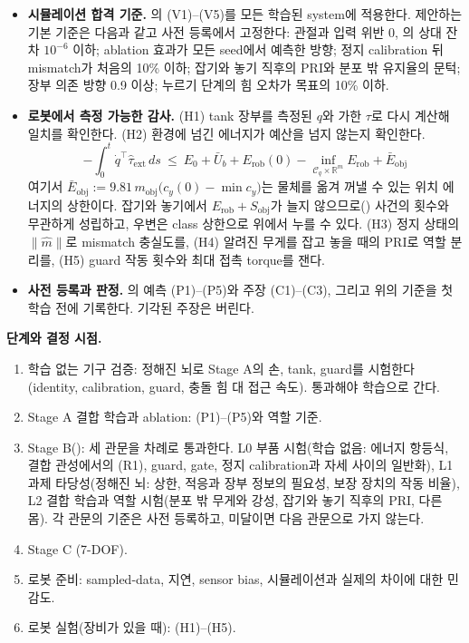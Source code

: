 \documentclass[11pt]{article}\usepackage[margin=1in]{geometry}\usepackage{amsmath,amssymb,amsthm,mathtools}\usepackage{graphicx}\graphicspath{{figures/}{../figures/}{figs/}{./}}\usepackage{enumitem}\usepackage{hyperref}\usepackage{cleveref}\usepackage{tikz}\usetikzlibrary{arrows.meta,positioning,calc,shapes.geometric}\usepackage{float}\usepackage{rotating}\usepackage[most]{tcolorbox}\usepackage{kotex}\usepackage{booktabs}\usepackage{longtable}\emergencystretch=1.6em\tolerance=2000 \crefname{assumption}{Assumption}{Assumptions}\Crefname{assumption}{Assumption}{Assumptions}\crefname{definition}{Definition}{Definitions}\Crefname{definition}{Definition}{Definitions}\crefname{proposition}{Proposition}{Propositions}\Crefname{proposition}{Proposition}{Propositions}\crefname{fact}{Fact}{Facts}\Crefname{fact}{Fact}{Facts} \newtheorem{assumption}{Assumption}\newtheorem{definition}{Definition}\newtheorem{lemma}{Lemma}\newtheorem{proposition}{Proposition}\newtheorem{theorem}{Theorem}\newtheorem{corollary}{Corollary}\newtheorem{fact}{Fact}\theoremstyle{remark}\newtheorem{remark}{Remark} \newcommand{\R}{\mathbb{R}}\newcommand{\xb}{\bar x}\newcommand{\Ab}{\bar A}\newcommand{\By}{\bar B_y}\newcommand{\U}{\mathcal U}\newcommand{\Z}{\mathcal Z}
\begin{document}
\begin{itemize}
\item \textbf{시뮬레이션 합격 기준.} 의 (V1)--(V5)를 모든 학습된 system에 적용한다. 제안하는 기본 기준은 다음과 같고 사전 등록에서 고정한다: 관절과 입력 위반 0, 의 상대 잔차 $10^{-6}$ 이하; ablation 효과가 모든 seed에서 예측한 방향; 정지 calibration 뒤 mismatch가 처음의 10\% 이하; 잡기와 놓기 직후의 PRI와 분포 밖 유지율의 문턱; 장부 의존 방향 0.9 이상; 누르기 단계의 힘 오차가 목표의 10\% 이하.
\item \textbf{로봇에서 측정 가능한 감사.} (H1) tank 장부를 측정된 $q$와 가한 $\tau$로 다시 계산해 일치를 확인한다. (H2) 환경에 넘긴 에너지가 예산을 넘지 않는지 확인한다.
\[
-\int_0^t\dot q^\top\hat\tau_{\mathrm{ext}}\,ds\ \le\ E_0+\bar U_b+E_{\mathrm{rob}}(0)-\inf_{\mathcal C_q\times\R^m}E_{\mathrm{rob}}+\bar E_{\mathrm{obj}}
\]
여기서 $\bar E_{\mathrm{obj}}:=9.81\,m_{\mathrm{obj}}\big(c_y(0)-\min c_y\big)$는 물체를 옮겨 꺼낼 수 있는 위치 에너지의 상한이다. 잡기와 놓기에서 $E_{\mathrm{rob}}+S_{\mathrm{obj}}$가 늘지 않으므로() 사건의 횟수와 무관하게 성립하고, 우변은 class 상한으로 위에서 누를 수 있다. (H3) 정지 상태의 $\|\hat m\|$로 mismatch 충실도를, (H4) 알려진 무게를 잡고 놓을 때의 PRI로 역할 분리를, (H5) guard 작동 횟수와 최대 접촉 torque를 잰다.
\item \textbf{사전 등록과 판정.} 의 예측 (P1)--(P5)와 주장 (C1)--(C3), 그리고 위의 기준을 첫 학습 전에 기록한다. 기각된 주장은 버린다.
\end{itemize}

\textbf{단계와 결정 시점.}
\begin{enumerate}[label=(M\arabic*)]
\item 학습 없는 기구 검증: 정해진 뇌로 Stage A의 손, tank, guard를 시험한다(identity, calibration, guard, 충돌 힘 대 접근 속도). 통과해야 학습으로 간다.
\item Stage A 결합 학습과 ablation: (P1)--(P5)와 역할 기준.
\item Stage B(): 세 관문을 차례로 통과한다. L0 부품 시험(학습 없음: 에너지 항등식, 결합 관성에서의 (R1), guard, gate, 정지 calibration과 자세 사이의 일반화), L1 과제 타당성(정해진 뇌: 상한, 적응과 장부 정보의 필요성, 보장 장치의 작동 비율), L2 결합 학습과 역할 시험(분포 밖 무게와 강성, 잡기와 놓기 직후의 PRI, 다른 몸). 각 관문의 기준은 사전 등록하고, 미달이면 다음 관문으로 가지 않는다.
\item Stage C (7-DOF).
\item 로봇 준비: sampled-data, 지연, sensor bias, 시뮬레이션과 실제의 차이에 대한 민감도.
\item 로봇 실험(장비가 있을 때): (H1)--(H5).
\end{enumerate}
\end{document}
